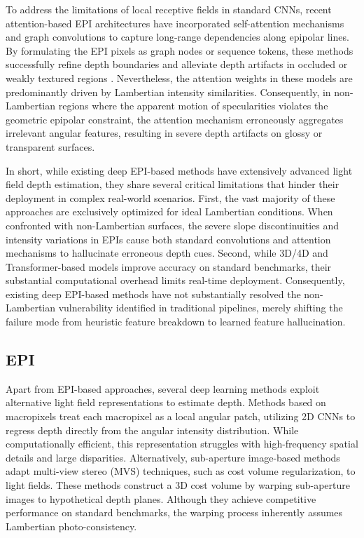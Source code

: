 \documentclass[lettersize,journal]{IEEEtran}
\begin{document}
To address the limitations of local receptive fields in standard CNNs, recent attention-based EPI architectures \cite{attentionatten_28} have incorporated self-attention mechanisms and graph convolutions to capture long-range dependencies along epipolar lines. By formulating the EPI pixels as graph nodes or sequence tokens, these methods successfully refine depth boundaries and alleviate depth artifacts in occluded or weakly textured regions \cite{occlusionocclu}. Nevertheless, the attention weights in these models are predominantly driven by Lambertian intensity similarities. Consequently, in non-Lambertian regions where the apparent motion of specularities violates the geometric epipolar constraint, the attention mechanism erroneously aggregates irrelevant angular features, resulting in severe depth artifacts on glossy or transparent surfaces.

In short, while existing deep EPI-based methods have extensively advanced light field depth estimation, they share several critical limitations that hinder their deployment in complex real-world scenarios. First, the vast majority of these approaches are exclusively optimized for ideal Lambertian conditions. When confronted with non-Lambertian surfaces, the severe slope discontinuities and intensity variations in EPIs cause both standard convolutions and attention mechanisms to hallucinate erroneous depth cues. Second, while 3D/4D and Transformer-based models improve accuracy on standard benchmarks, their substantial computational overhead limits real-time deployment. Consequently, existing deep EPI-based methods have not substantially resolved the non-Lambertian vulnerability identified in traditional pipelines, merely shifting the failure mode from heuristic feature breakdown to learned feature hallucination.

\subsection{EPI}

Apart from EPI-based approaches, several deep learning methods exploit alternative light field representations to estimate depth. Methods based on macropixels \cite{learninglearn} treat each macropixel as a local angular patch, utilizing 2D CNNs to regress depth directly from the angular intensity distribution. While computationally efficient, this representation struggles with high-frequency spatial details and large disparities. Alternatively, sub-aperture image-based methods \cite{subsub} adapt multi-view stereo (MVS) techniques, such as cost volume regularization, to light fields. These methods construct a 3D cost volume by warping sub-aperture images to hypothetical depth planes. Although they achieve competitive performance on standard benchmarks, the warping process inherently assumes Lambertian photo-consistency. 
\end{document}

